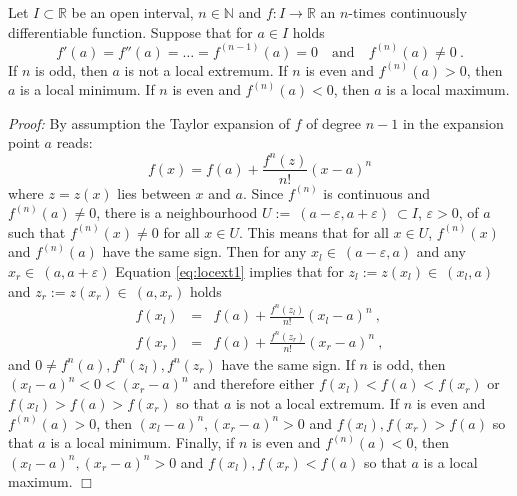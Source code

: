 \begin{Theorem}{}\label{th:locext}
    Let $I\subset \mathbb{R}$ be an open interval, $n\in\mathbb{N}$ and $f:I\rightarrow\mathbb{R}$ an $n$-times continuously differentiable function. 
  Suppose that for $a\in I$ holds 
	$$f'(a)=f''(a)=\dots=f^{(n-1)}(a)=0\quad \text{and}\quad f^{(n)}(a)\neq 0 \ .$$
	If $n$ is odd, then $a$ is not a local extremum.
  If $n$ is even and $f^{(n)}(a)> 0$, then $a$ is a local minimum.
  If $n$ is even and $f^{(n)}(a)< 0$, then $a$ is a local maximum.   
\end{Theorem}

{\em Proof:} By assumption the Taylor expansion of $f$ of degree $n-1$ in the expansion point $a$ reads:
	\begin{equation}\label{eq:locext1} f(x)=f(a)+\frac{f^{n}(z)}{n!}(x-a)^n  \end{equation}
  where $z=z(x)$ lies between $x$ and $a$. Since $f^{(n)}$ is continuous and $f^{(n)}(a)\neq 0$,
  there is a neighbourhood $U:=~(a-\varepsilon,a+\varepsilon)~\subset I$, $\varepsilon>0$, of $a$ such that $f^{(n)}(x)\neq 0$ for all $x\in U$. 
  This means that for all $x\in U$, $f^{(n)}(x)$ and $f^{(n)}(a)$ have the same sign.
  Then for any $x_l \in~(a-\varepsilon,a)$ and any $x_r \in~(a,a+\varepsilon)$ Equation 
  \eqref{eq:locext1} implies that for $z_l:=z(x_l)\in~(x_l,a)$ and $z_r:=z(x_r)\in~(a,x_r)$ holds
	\begin{eqnarray*}
	  f(x_l) &=& f(a)+\frac{f^{n}(z_l)}{n!}(x_l-a)^n \ ,\\
	  f(x_r) &=& f(a)+\frac{f^{n}(z_r)}{n!}(x_r-a)^n \ ,
	\end{eqnarray*}
  and $0\neq f^{n}(a), f^{n}(z_l),f^{n}(z_r)$ have the same sign.
  If $n$ is odd,  then $(x_l-a)^n < 0 < (x_r-a)^n$  and therefore  either $f(x_l)<f(a)<f(x_r)$ or $f(x_l)>f(a)>f(x_r)$
  so that $a$ is not a local extremum.
  If $n$ is even and $f^{(n)}(a)>0$, then $(x_l-a)^n,(x_r-a)^n >0$ and  $f(x_l),f(x_r)>f(a)$ so that $a$ is a local minimum.
  Finally, if $n$ is even and $f^{(n)}(a)<0$, then $(x_l-a)^n,(x_r-a)^n >0$ and $f(x_l),f(x_r)<f(a)$ so that $a$ is a local maximum.
$\Box$

